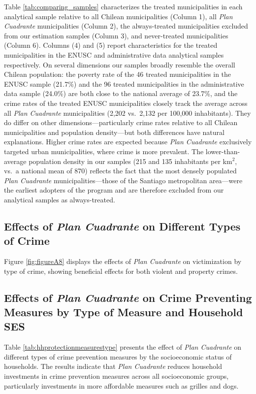 Table \ref{tab:comparing_samples} characterizes the treated municipalities in each analytical sample relative to all Chilean municipalities (Column 1), all \emph{Plan Cuadrante} municipalities (Column 2), the always-treated municipalities excluded from our estimation samples (Column 3), and never-treated municipalities (Column 6). Columns (4) and (5) report characteristics for the treated municipalities in the ENUSC and administrative data analytical samples respectively. On several dimensions our samples broadly resemble the overall Chilean population: the poverty rate of the 46 treated municipalities in the ENUSC sample (21.7\%) and the 96 treated municipalities in the administrative data sample (24.0\%) are both close to the national average of 23.7\%, and the crime rates of the treated ENUSC municipalities closely track the average across all \emph{Plan Cuadrante} municipalities (2,202 vs.\ 2,132 per 100,000 inhabitants). They do differ on other dimensions---particularly crime rates relative to all Chilean municipalities and population density---but both differences have natural explanations. Higher crime rates are expected because \emph{Plan Cuadrante} exclusively targeted urban municipalities, where crime is more prevalent. The lower-than-average population density in our samples (215 and 135 inhabitants per km$^2$, vs.\ a national mean of 870) reflects the fact that the most densely populated \emph{Plan Cuadrante} municipalities---those of the Santiago metropolitan area---were the earliest adopters of the program and are therefore excluded from our analytical samples as always-treated. 





\clearpage

\subsection{Effects of \emph{Plan Cuadrante} on Different Types of Crime}
Figure \ref{fig:figureA8} displays the effects of \emph{Plan Cuadrante} on victimization by type of crime, showing beneficial effects for both violent and property crimes. 



\clearpage

\subsection{Effects of \emph{Plan Cuadrante} on Crime Preventing Measures by Type of Measure and Household SES}
Table \ref{tab:hhprotectionmeasurestype} presents the effect of \emph{Plan Cuadrante} on different types of crime prevention measures by the socioeconomic status of households. The results indicate that \emph{Plan Cuadrante} reduces household investments in crime prevention measures across all socioeconomic groups, particularly investments in more affordable measures such as grilles and dogs.

